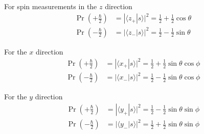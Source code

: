 \iffalse
Hence
\begin{equation*}
S_z|z_\pm\rangle=\pm\tfrac{\hbar}{2}|z_\pm\rangle,
\quad
S_x|x_\pm\rangle=\pm\tfrac{\hbar}{2}|x_\pm\rangle,
\quad
S_y|y_\pm\rangle=\pm\tfrac{\hbar}{2}|y_\pm\rangle,
\end{equation*}
\fi

For spin measurements in the $z$ direction
\begin{align*}
\Pr\left(+\tfrac{\hbar}{2}\right)&=|\langle z_+|s\rangle|^2=\tfrac{1}{2}+\tfrac{1}{2}\cos\theta
\\
\Pr\left(-\tfrac{\hbar}{2}\right)&=|\langle z_-|s\rangle|^2=\tfrac{1}{2}-\tfrac{1}{2}\sin\theta
\end{align*}

For the $x$ direction
\begin{align*}
\Pr\left(+\tfrac{\hbar}{2}\right)&=|\langle x_+|s\rangle|^2=\tfrac{1}{2}+\tfrac{1}{2}\sin\theta\cos\phi
\\
\Pr\left(-\tfrac{\hbar}{2}\right)&=|\langle x_-|s\rangle|^2=\tfrac{1}{2}-\tfrac{1}{2}\sin\theta\cos\phi
\end{align*}

For the $y$ direction
\begin{align*}
\Pr\left(+\tfrac{\hbar}{2}\right)&=|\langle y_+|s\rangle|^2=\tfrac{1}{2}-\tfrac{1}{2}\sin\theta\sin\phi
\\
\Pr\left(-\tfrac{\hbar}{2}\right)&=|\langle y_-|s\rangle|^2=\tfrac{1}{2}+\tfrac{1}{2}\sin\theta\sin\phi
\end{align*}


